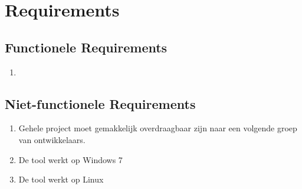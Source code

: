 \section{Requirements}

\subsection{Functionele Requirements}
\begin{enumerate}
    \item 
\end{enumerate}

\subsection{Niet-functionele Requirements}
\begin{enumerate}
    \item Gehele project moet gemakkelijk overdraagbaar zijn naar een volgende groep van ontwikkelaars. 
    \item De tool werkt op Windows 7
    \item De tool werkt op Linux
\end{enumerate}
